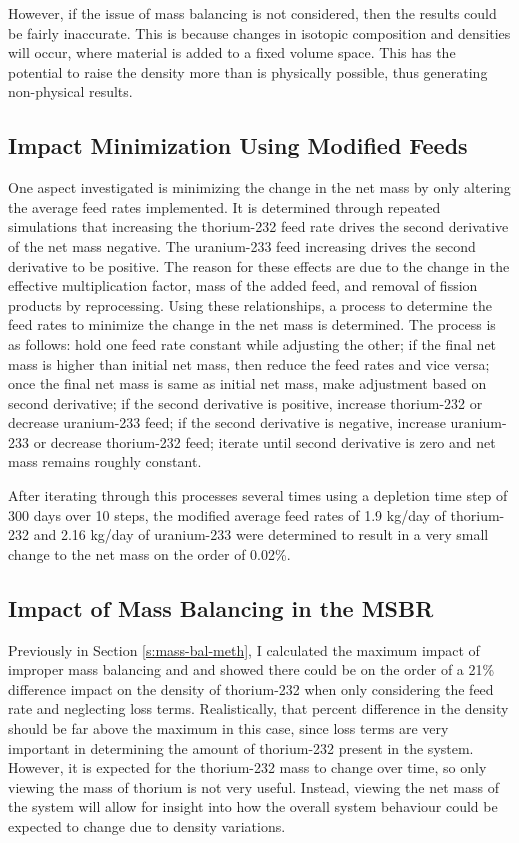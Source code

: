 However, if the issue of mass balancing is not considered, then the results could be fairly inaccurate.
This is because changes in isotopic composition and densities will occur, where material is added to a fixed volume space. This has the potential to raise the density more than is physically possible, thus generating non-physical results.

\subsection{Impact Minimization Using Modified Feeds}

One aspect investigated is minimizing the change in the net mass by only altering the average feed rates implemented. It is determined through repeated simulations that increasing the thorium-232 feed rate drives the second derivative of the net mass negative. The uranium-233 feed increasing drives the second derivative to be positive. The reason for these effects are due to the change in the effective multiplication factor, mass of the added feed, and removal of fission products by reprocessing.
Using these relationships, a process to determine the feed rates to minimize the change in the net mass is determined. The process is as follows:  hold one feed rate constant while adjusting the other;
if the final net mass is higher than initial net mass, then reduce the feed rates and vice versa;
once the final net mass is same as initial net mass, make adjustment based on second derivative;
if the second derivative is positive, increase thorium-232 or decrease uranium-233 feed;
if the second derivative is negative, increase uranium-233 or decrease thorium-232 feed;
iterate until second derivative is zero and net mass remains roughly constant.

After iterating through this processes several times using a depletion time step of 300 days over 10 steps, the modified average feed rates of 1.9 kg/day of thorium-232 and 2.16 kg/day of uranium-233 were determined to result in a very small change to the net mass on the order of 0.02\%.

\subsection{Impact of Mass Balancing in the MSBR}

Previously in Section \ref{s:mass-bal-meth}, I calculated the maximum impact of improper mass balancing and and showed there could be on the order of a 21\% difference impact on the density of thorium-232 when only considering the feed rate and neglecting loss terms. Realistically, that percent difference in the density should be far above the maximum in this case, since loss terms are very important in determining the amount of thorium-232 present in the system. However, it is expected for the thorium-232 mass to change over time, so only viewing the mass of thorium is not very useful. Instead, viewing the net mass of the system will allow for insight into how the overall system behaviour could be expected to change due to density variations.

